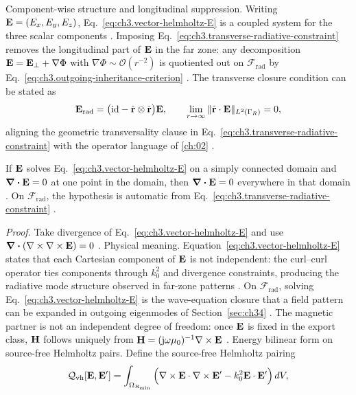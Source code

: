 Component-wise structure and longitudinal suppression. Writing \(\mathbf{E}=(E_x,E_y,E_z)\), Eq.~\eqref{eq:ch3.vector-helmholtz-E} is a coupled system for the three scalar
components . Imposing Eq.~\eqref{eq:ch3.transverse-radiative-constraint} removes the
longitudinal part of \(\mathbf{E}\) in the far zone: any decomposition \(\mathbf{E}=\mathbf{E}_{\perp}+\nabla\Phi\) with
\(\nabla\Phi\sim\mathcal{O}(r^{-2})\) is quotiented out on \(\mathcal{F}_{\mathrm{rad}}\) by
Eq.~\eqref{eq:ch3.outgoing-inheritance-criterion} . The transverse closure condition
can be stated as
\begin{equation}
\label{eq:ch3.transverse-projector-certificate}
\mathbf{E}_{\mathrm{rad}}
=
\big(\mathrm{id}-\hat{\mathbf{r}}\otimes\hat{\mathbf{r}}\big)\mathbf{E},
\qquad
\lim_{r\to\infty}\|\hat{\mathbf{r}}\cdot\mathbf{E}\|_{L^{2}(\Gamma_{R})}=0,
\end{equation}
aligning the geometric transversality clause in Eq.~\eqref{eq:ch3.transverse-radiative-constraint} with the
operator language of \ref{ch:02} .
\begin{proposition}
\label{prop:ch3.div-free-preservation}
If \(\mathbf{E}\) solves Eq.~\eqref{eq:ch3.vector-helmholtz-E} on a simply connected domain and \(\div\mathbf{E}=0\) at one
point in the domain, then \(\div\mathbf{E}=0\) everywhere in that domain . On
\(\mathcal{F}_{\mathrm{rad}}\), the hypothesis is automatic from
Eq.~\eqref{eq:ch3.transverse-radiative-constraint} .
\end{proposition}
\noindent\textit{Proof.}
Take divergence of Eq.~\eqref{eq:ch3.vector-helmholtz-E} and use
\(\div(\nabla\times\nabla\times\mathbf{E})=0\) .
Physical meaning. Equation~\eqref{eq:ch3.vector-helmholtz-E} states that each Cartesian component of \(\mathbf{E}\) is not independent:
the curl--curl operator ties components through \(k_0^2\) and divergence constraints, producing the radiative
mode structure observed in far-zone patterns . On \(\mathcal{F}_{\mathrm{rad}}\),
solving Eq.~\eqref{eq:ch3.vector-helmholtz-E} is the wave-equation closure that a field pattern can be
expanded in outgoing eigenmodes of Section~\ref{sec:ch34} . The magnetic partner is not an
independent degree of freedom: once \(\mathbf{E}\) is fixed in the export class, \(\mathbf{H}\) follows uniquely from
\(\mathbf{H}=(\mathrm{j}\omega\mu_0)^{-1}\nabla\times\mathbf{E}\) .
Energy bilinear form on source-free Helmholtz pairs. Define the source-free Helmholtz pairing
\begin{equation}
\label{eq:ch3.helmholtz-energy-bilinear}
\mathcal{Q}_{\mathrm{vh}}[\mathbf{E},\mathbf{E}']
=
\int_{\Omega_{R_{\min}}}
\Big(
\nabla\times\mathbf{E}\cdot\nabla\times\mathbf{E}'
-k_{0}^{2}\mathbf{E}\cdot\mathbf{E}'
\Big)\,dV,
\end{equation}

